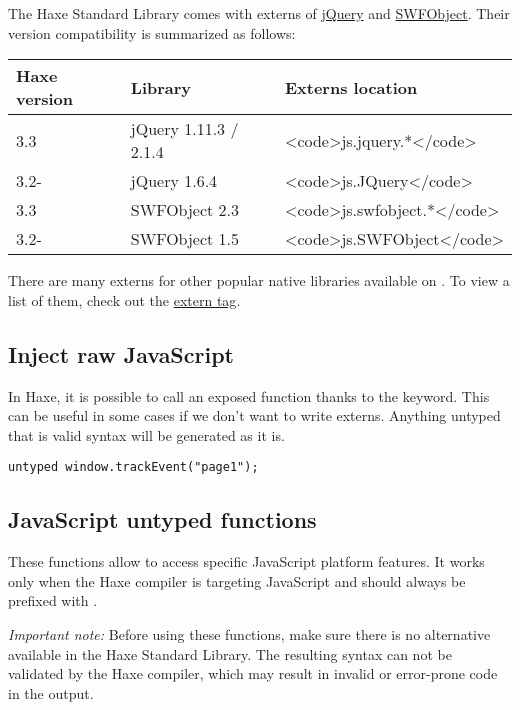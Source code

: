 The Haxe Standard Library comes with externs of \href{https://jquery.com/}{jQuery} and \href{http://blog.deconcept.com/swfobject/}{SWFObject}. Their version compatibility is summarized as follows:

\begin{center}
\begin{tabular}{| l | l | l |}
	\hline
	Haxe version & Library               & Externs location \\ \hline
	3.3          & jQuery 1.11.3 / 2.1.4 & <code>js.jquery.*</code> \\
	3.2-         & jQuery 1.6.4          & <code>js.JQuery</code> \\
	3.3          & SWFObject 2.3         & <code>js.swfobject.*</code> \\
	3.2-         & SWFObject 1.5         & <code>js.SWFObject</code> \\ \hline
\end{tabular}
\end{center}

There are many externs for other popular native libraries available on . To view a list of them, check out the \href{http://lib.haxe.org/t/extern/}{extern tag}.

\subsection{Inject raw JavaScript}
\label{target-javascript-injection}

In Haxe, it is possible to call an exposed function thanks to the  keyword. This can be useful in some cases if we don't want to write externs. Anything untyped that is valid syntax will be generated as it is.

\begin{lstlisting}
untyped window.trackEvent("page1");  
\end{lstlisting}


\subsection{JavaScript untyped functions}
\label{target-javascript-untyped}

These functions allow to access specific JavaScript platform features. It works only when the Haxe compiler is targeting JavaScript and should always be prefixed with . 

\emph{Important note:} Before using these functions, make sure there is no alternative available in the Haxe Standard Library. The resulting syntax can not be validated by the Haxe compiler, which may result in invalid or error-prone code in the output.

